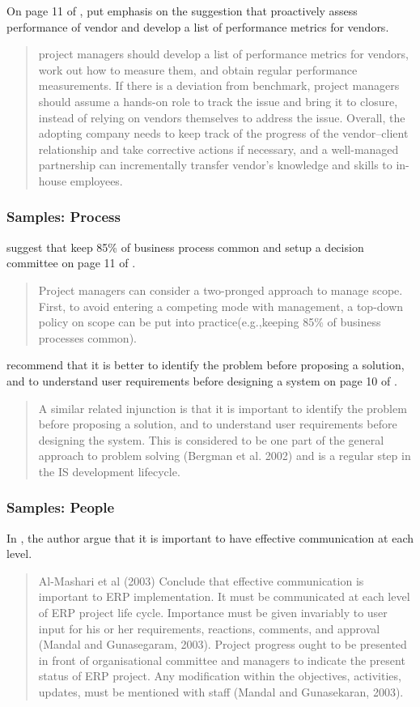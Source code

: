 On page 11 of , \citeauthor{2} put emphasis on the suggestion that proactively assess performance of vendor and develop a list of performance metrics for vendors.
\begin{quotation}
project managers should develop a list of performance metrics for vendors, work out how to measure them, and obtain regular performance measurements. If there is a deviation from benchmark, project managers should assume a hands-on role to track the issue and bring it to closure, instead of relying on vendors themselves to address the issue. Overall, the adopting company needs to keep track of the progress of the vendor–client relationship and take corrective actions if necessary, and a well-managed partnership can incrementally transfer vendor’s knowledge and skills to in-house employees.
\end{quotation}

\subsubsection{Samples: Process}
\citeauthor{2} suggest that keep 85\% of business process common and setup a decision committee on page 11 of .
\begin{quotation}
Project managers can consider a two-pronged approach to manage scope. First, to avoid entering a competing mode with management, a top-down policy on scope can be put into practice(e.g.,keeping 85\% of business processes common).
\end{quotation}

\citeauthor{6} recommend that it is better to identify the problem before proposing a solution, and to understand user requirements before designing a system on page 10 of .
\begin{quotation}
A similar related injunction is that it is important to identify the problem before proposing a solution, and to understand user requirements before designing the system. This is considered to be one part of the general approach to problem solving (Bergman et al. 2002) and is a regular step in the IS development lifecycle.
\end{quotation}


\subsubsection{Samples: People}
In , the author argue that it is important to have effective communication at each level.
\begin{quotation}
Al-Mashari et al (2003) Conclude that effective communication is important to ERP implementation. It must be communicated at each level of ERP project life cycle. Importance must be given invariably to user input for his or her requirements, reactions, comments, and approval (Mandal and Gunasegaram, 2003). Project progress ought to be presented in front of organisational committee and managers to indicate the present status of ERP project. Any modification within the objectives, activities, updates, must be mentioned with staff (Mandal and Gunasekaran, 2003).
\end{quotation}


